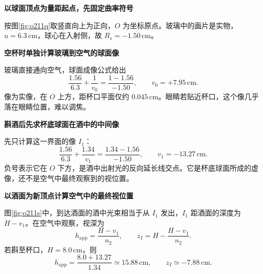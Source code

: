 \begin{solution}\textbf{以球面顶点为量距起点，先固定曲率符号}\par\nobreak
按图\ref{fig:o211q}取竖直向上为正向，\(O\) 为坐标原点。玻璃中的画片是实物，
\(u=6.3\,\mathrm{cm}\)，球心在入射侧，故 \(R_{\!s}=-1.50\,\mathrm{cm}\)。



\par\medskip{}\noindent\textbf{空杯时单独计算玻璃到空气的球面像}\par\nobreak
玻璃直接通向空气，球面成像公式给出
\[
 \frac{1.56}{6.3}+\frac1{v_0}
 =\frac{1-1.56}{-1.50},
 \qquad
 \boxed{v_0=+7.95\,\mathrm{cm}}.
\]
像为实像，在 \(O\) 上方，距杯口平面仅约 \(0.045\,\mathrm{cm}\)。眼睛若贴近杯口，这个像几乎落在眼睛位置，难以调焦。



\par\medskip{}\noindent\textbf{斟酒后先求杯底球面在酒中的中间像}\par\nobreak
先只计算这一界面的像 \(I_1\)：
\[
 \frac{1.56}{6.3}+\frac{1.34}{v_1}
 =\frac{1.34-1.56}{-1.50},
 \qquad
 \boxed{v_1=-13.27\,\mathrm{cm}}.
\]
负号表示它在 \(O\) 下方，是酒中出射光的反向延长线交点。它是杯底球面所成的虚像，还不是空气中最终观察到的视位置。




\par\medskip{}\noindent\textbf{以酒面为新顶点计算空气中的最终视位置}\par\nobreak
图\ref{fig:o211s}中，到达酒面的酒中光束相当于从 \(I_1\) 发出，\(I_1\) 距酒面的深度为 \(H-v_1\)。在空气中观察，视深为
\[
 h_{\mathrm{app}}=\frac{H-v_1}{n_2},
 \qquad
 \boxed{z_I=H-\frac{H-v_1}{n_2}}.
\]
若斟至杯口，\(H=8.0\,\mathrm{cm}\)，则
\[
 h_{\mathrm{app}}=\frac{8.0+13.27}{1.34}
 \simeq15.88\,\mathrm{cm},\qquad
 \boxed{z_I\simeq-7.88\,\mathrm{cm}}.
\]



\end{solution}
